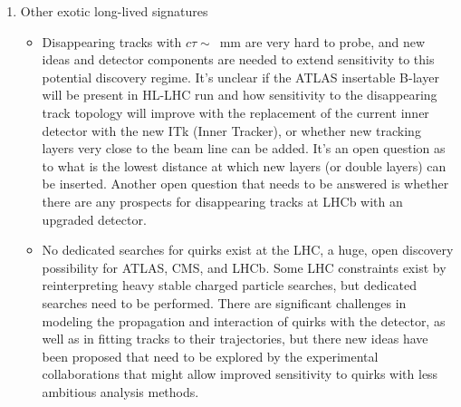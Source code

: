 \begin{enumerate}
\item Other exotic long-lived signatures
	\begin{itemize}
	\item Disappearing tracks with $c \tau \sim$~mm are very hard to probe, and new ideas and detector components are needed to extend sensitivity to this potential discovery regime. It's unclear if the ATLAS insertable B-layer will be present in HL-LHC run and how sensitivity to the disappearing track topology will improve with the replacement of the current inner detector with the new ITk (Inner Tracker), or whether new tracking layers very close to the beam line can be added. It's an open question as to what is the lowest distance at which new layers (or double layers) can be inserted. Another open question that needs to be answered is whether there are any prospects for disappearing tracks at LHCb with an upgraded detector.
	\item No dedicated searches for quirks exist at the LHC, a huge, open discovery possibility for ATLAS, CMS, and LHCb. Some LHC constraints exist by reinterpreting heavy stable charged particle searches, but dedicated searches need to be performed. There are significant challenges in modeling the propagation and interaction of quirks with the detector, as well as in fitting tracks to their trajectories, but there new ideas have been proposed that need to be explored by the experimental collaborations that might allow improved sensitivity to quirks with less ambitious analysis methods.
	\end{itemize}
\end{enumerate}


